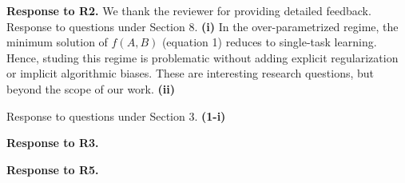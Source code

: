 \documentclass{article}
\begin{document}
	\textbf{Response to R2.} We thank the reviewer for providing detailed feedback.
	Response to questions under Section 8.
	\textbf{(i)}
	In the over-parametrized regime, the minimum solution of $f(A ,B)$ (equation 1) reduces to single-task learning.
	Hence, studing this regime is problematic without adding explicit regularization or implicit algorithmic biases.
	These are interesting research questions, but beyond the scope of our work.
	\textbf{(ii)}

	Response to questions under Section 3.
	\textbf{(1-i)}

	\textbf{Response to R3.}

	\textbf{Response to R5.}
\end{document}
